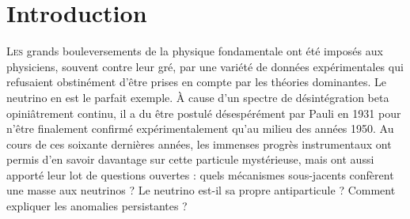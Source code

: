 

\chapter*{Introduction}
\label{chap:introduction}




\lettrine{L}{es} grands bouleversements de la physique fondamentale ont été imposés aux physiciens, souvent contre leur gré, par une variété de données expérimentales qui refusaient obstinément d'être prises en compte par les théories dominantes. Le neutrino en est le parfait exemple. À cause d'un spectre de désintégration beta opiniâtrement continu, il a du être postulé désespérément par Pauli en 1931 pour n'être finalement confirmé expérimentalement qu'au milieu des années 1950. Au cours de ces soixante dernières années, les immenses progrès instrumentaux ont permis d'en savoir davantage sur cette particule mystérieuse, mais ont aussi apporté leur lot de questions ouvertes : quels mécanismes sous-jacents confèrent une masse aux neutrinos ? Le neutrino est-il sa propre antiparticule ? Comment expliquer les anomalies persistantes ?\\

